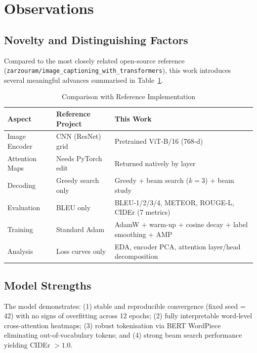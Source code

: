 \documentclass[conference]{IEEEtran}
\begin{document}
\section{Observations}

\subsection{Novelty and Distinguishing Factors}
Compared to the most closely related open-source reference (\texttt{zarzouram/image\_captioning\_with\_transformers}), this work introduces several meaningful advances summarised in Table~\ref{tab:reference_comparison}.

\begin{table}[htbp]
\caption{Comparison with Reference Implementation}
\label{tab:reference_comparison}
\centering
\small
\begin{tabular}{@{}lp{2.6cm}p{3.2cm}@{}}
\toprule
\textbf{Aspect} & \textbf{Reference Project} & \textbf{This Work} \\
\midrule
Image Encoder & CNN (ResNet) grid & Pretrained ViT-B/16 (768-d) \\
Attention Maps & Needs PyTorch edit & Returned natively by layer \\
Decoding & Greedy search only & Greedy + beam search ($k=3$) + beam study \\
Evaluation & BLEU only & BLEU-1/2/3/4, METEOR, ROUGE-L, CIDEr (7 metrics) \\
Training & Standard Adam & AdamW + warm-up + cosine decay + label smoothing + AMP \\
Analysis & Loss curves only & EDA, encoder PCA, attention layer/head decomposition \\
\bottomrule
\end{tabular}
\end{table}

\subsection{Model Strengths}
The model demonstrates: (1) stable and reproducible convergence (fixed seed = 42) with no signs of overfitting across 12 epochs; (2) fully interpretable word-level cross-attention heatmaps; (3) robust tokenisation via BERT WordPiece eliminating out-of-vocabulary tokens; and (4) strong beam search performance yielding CIDEr $> 1.0$.
\end{document}
